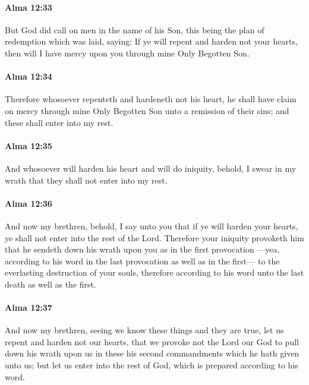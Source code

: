 		\paragraph{Alma 12:33} %
			\label{ALMA-12-33}

			But God did call on men in the name of his Son,
			this being the plan of redemption which was laid, saying:
			If ye will repent and harden not your hearts,
			then will I have mercy upon you through mine Only Begotten Son.

		\paragraph{Alma 12:34} %
			\label{ALMA-12-34}

			Therefore whosoever repenteth and hardeneth not his heart,
			he shall have claim on mercy through mine Only Begotten Son
			unto a remission of their sins;
			and these shall enter into my rest.

		\paragraph{Alma 12:35} %
			\label{ALMA-12-35}

			And whosoever will harden his heart and will do iniquity,
			behold, I swear in my wrath that they shall not enter into my rest.

		\paragraph{Alma 12:36} %
			\label{ALMA-12-36}

			And now my brethren, behold, I say unto you that
			if ye will harden your hearts,
			ye shall not enter into the rest of the Lord.
			Therefore your iniquity provoketh him
			that he sendeth down his wrath upon you as in the first provocation
			---yea, according to his word in the last provocation as well as in the first---
			to the everlasting destruction of your souls,
			therefore according to his word unto the last death as well as the first.

		\paragraph{Alma 12:37} %
			\label{ALMA-12-37}

			And now my brethren, seeing we know these things and they are true,
			let us repent and harden not our hearts,
			that we provoke not the Lord our God to pull down his wrath upon us
			in these his second commandments which he hath given unto us;
			but let us enter into the rest of God,
			which is prepared according to his word.

